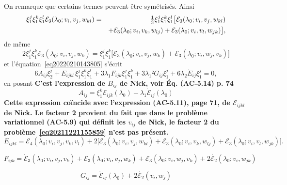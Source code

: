 \documentclass[12pt, final]{amsart}
\begin{document}
On remarque que certains termes peuvent être symétrisés. Ainsi
\begin{eqnarray}
  \notag
  \xi _1^j\xi _1^k\xi _1^l\mathcal E_3(\lambda _0; v_i, v_j, w_{kl})
  &=&\tfrac13\xi _1^j\xi _1^k\xi _1^l\bigl[\mathcal E_3(\lambda _0; v_i, v_j, w_{kl})\\
  &&+\mathcal E_3(\lambda _0; v_i, v_k, w_{lj})+\mathcal E_3(\lambda _0; v_i, v_l, w_{jk})\bigr],
\end{eqnarray}
de même
\begin{equation}
  2\xi _1^j\xi _1^k\mathcal E_3(\lambda _0; v_i, v_j, w_k)=\xi _1^j\xi _1^k\bigl[\mathcal E_3(\lambda _0; v_i, v_j, w_k)
  +\mathcal E_3(\lambda _0; v_i, w_j, v_k)\bigr]
\end{equation}
et l'équation~\eqref{eq20220210143805} s'écrit
\begin{equation}
\label{eq20220216141706}
  6A_{ij}\xi _2^j+E_{ijkl}\,\xi _1^j\xi _1^k\xi _1^l+3\lambda _1F_{ijk}\xi _1^j\xi _1^k+3\lambda _1²G_{ij}\xi _1^j
  +6\lambda _2\mathring{E}_{ij}\xi _1^j=0,
\end{equation}
en posant \textbf{C'est l'expression de \(B_{ij}\) de Nick, voir
  Éq. (AC-5.14) p. 74}
\begin{equation}
  A_{ij}=\xi _1^k\mathcal E_{ijk}(\lambda _0)+\lambda _1\dot{\mathcal E}_{ij}(\lambda _0)
\end{equation}
\textbf{Cette expression coïncide avec l'expression
  (AC-5.11), page 71, de \(\mathcal E_{ijkl}\) de Nick. Le facteur 2 provient du fait que
  dans le problème variationnel (AC-5.9) qui définit les \(v_{ij}\) de Nick, le
  facteur 2 du problème~\eqref{eq20211221155859} n'est pas présent.}
\begin{equation}
  E_{ijkl}=\mathcal E_4(\lambda _0; v_i, v_j, v_k, v_l)+2\bigl[\mathcal E_3(\lambda _0; v_i, v_j, w_{kl})
  +\mathcal E_3(\lambda _0; v_i, v_k, w_{lj})+\mathcal E_3(\lambda _0; v_i, v_l, w_{jk})\bigr].
\end{equation}

\begin{equation}
  F_{ijk}=\dot{\mathcal E}_3(\lambda _0; v_i, v_j, v_k)+\mathcal E_3(\lambda _0; v_i, v_j, w_k)
  +\mathcal E_3(\lambda _0; v_i, w_j, v_k)+2\dot{\mathcal E_2}(\lambda _0; v_i, w_{jk})
\end{equation}

\begin{equation}
  G_{ij}=\ddot{\mathcal E}_{ij}(\lambda _0)+2\dot{\mathcal E_2}(v_i, w_j)
\end{equation}
\end{document}
